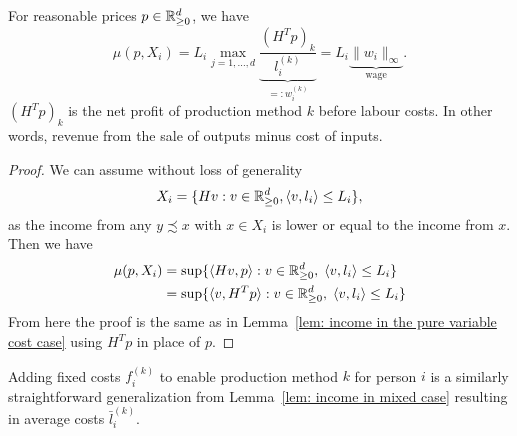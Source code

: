 \begin{lemma}
	For reasonable prices \(p\in \mathbb{R}_{\ge 0}^d\), we have
	\[
		\mu(p, X_i)
		= L_i \max_{j=1,\dots,d}
		\underbrace{\frac{(H^T p)_k}{l_i^{(k)}}}_{=:w_i^{(k)}}
		= L_i \underbrace{\|w_i\|_\infty}_{\text{wage}}.
	\]
	\((H^T p)_k\) is the net profit of production method \(k\) before labour
	costs. In other words, revenue from the sale of outputs minus cost of inputs.
\end{lemma}
\begin{proof}
	We can assume without loss of generality
	\[
		X_i = \{ Hv : v\in \mathbb{R}_{\ge 0}^d, \langle v, l_i\rangle \le L_i\},
	\]
	as the income from any \(y\precsim x\) with \(x\in X_i\) is lower or equal
	to the income from \(x\). Then we have
	\[\begin{aligned}
		\mu(p, X_i)
		&= \sup\{
			\langle Hv, p\rangle :
			v\in \mathbb{R}_{\ge 0}^d,\; \langle v, l_i\rangle \le L_i
		\}\\
		&= \sup\{
			\langle v, H^T p\rangle :
			v\in \mathbb{R}_{\ge 0}^d,\; \langle v, l_i\rangle \le L_i
		\}
	\end{aligned}\]
	From here the proof is the same as in Lemma~\ref{lem: income in the pure variable cost case}
	using \(H^T p\) in place of \(p\).
\end{proof}

Adding fixed costs \(f^{(k)}_i\) to enable production method \(k\) for person
\(i\) is a similarly straightforward generalization from Lemma~\ref{lem: income
in mixed case} resulting in average costs \(\bar{l}_i^{(k)}\).
